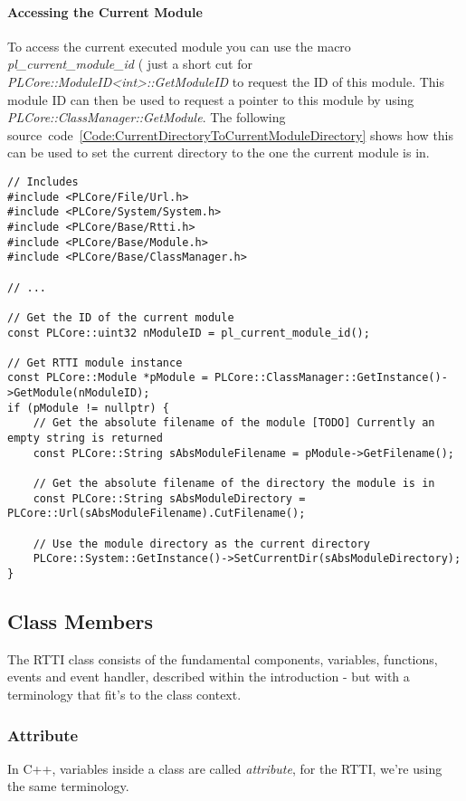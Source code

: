 \paragraph{Accessing the Current Module}
To access the current executed module you can use the macro \emph{pl\_current\_module\_id} ( just a short cut for \emph{PLCore::ModuleID<int>::GetModuleID} to request the ID of this module. This module ID can then be used to request a pointer to this module by using \emph{PLCore::ClassManager::GetModule}. The following source~code~\ref{Code:CurrentDirectoryToCurrentModuleDirectory} shows how this can be used to set the current directory to the one the current module is in.
\begin{lstlisting}[label=Code:CurrentDirectoryToCurrentModuleDirectory,caption={Setting the current directory to the one the current module is in}]
// Includes
#include <PLCore/File/Url.h>
#include <PLCore/System/System.h>
#include <PLCore/Base/Rtti.h>
#include <PLCore/Base/Module.h>
#include <PLCore/Base/ClassManager.h>

// ...

// Get the ID of the current module
const PLCore::uint32 nModuleID = pl_current_module_id();

// Get RTTI module instance
const PLCore::Module *pModule = PLCore::ClassManager::GetInstance()->GetModule(nModuleID);
if (pModule != nullptr) {
	// Get the absolute filename of the module [TODO] Currently an empty string is returned
	const PLCore::String sAbsModuleFilename = pModule->GetFilename();

	// Get the absolute filename of the directory the module is in
	const PLCore::String sAbsModuleDirectory = PLCore::Url(sAbsModuleFilename).CutFilename();

	// Use the module directory as the current directory
	PLCore::System::GetInstance()->SetCurrentDir(sAbsModuleDirectory);
}
\end{lstlisting}




\subsection{Class Members}
The RTTI class consists of the fundamental components, variables, functions, events and event handler, described within the introduction - but with a terminology that fit's to the class context.



\subsubsection{Attribute}
In C++, variables inside a class are called \emph{attribute}, for the RTTI, we're using the same terminology.


